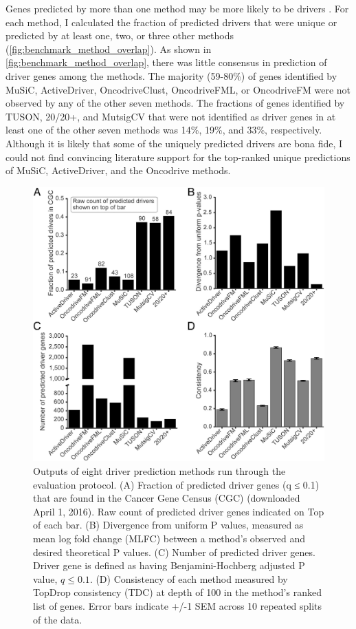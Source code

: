 Genes predicted by more than one method may be more likely to be drivers \cite{RN96}. For each method, I calculated the fraction of predicted drivers that were unique or predicted by at least one, two, or three other methods (\autoref{fig:benchmark_method_overlap}). As shown in \autoref{fig:benchmark_method_overlap}, there was little consensus in prediction of driver genes among the methods. The majority (59-80\%) of genes identified by MuSiC, ActiveDriver, OncodriveClust, OncodriveFML, or OncodriveFM were not observed by any of the other seven methods. The fractions of genes identified by TUSON, 20/20+, and MutsigCV that were not identified as driver genes in at least one of the other seven methods was 14\%, 19\%, and 33\%, respectively. Although it is likely that some of the uniquely predicted drivers are bona fide, I could not find convincing literature support for the top-ranked unique predictions of MuSiC, ActiveDriver, and the Oncodrive methods. 

\begin{figure}
  \centering
  \makeatletter
  \let\@currsize\normalsize
  \includegraphics[width=0.9\linewidth]{figures/chapter4/evaluation.jpg}
  \caption[Outputs of eight driver prediction methods run through the evaluation protocol.]{Outputs of eight driver prediction methods run through the evaluation protocol. (A) Fraction of predicted driver genes (q ≤ 0.1) that are found in the Cancer Gene Census (CGC) (downloaded April 1, 2016). Raw count of predicted driver genes indicated on Top of each bar. (B) Divergence from uniform P values, measured as mean log fold change (MLFC) between a method's observed and desired theoretical P values. (C) Number of predicted driver genes. Driver gene is defined as having Benjamini-Hochberg adjusted P value, $q \leq 0.1$. (D) Consistency of each method measured by TopDrop consistency (TDC) at depth of 100 in the method's ranked list of genes. Error bars indicate +/-1 SEM across 10 repeated splits of the data.}
  \label{fig:benchmark_result}
\end{figure}


